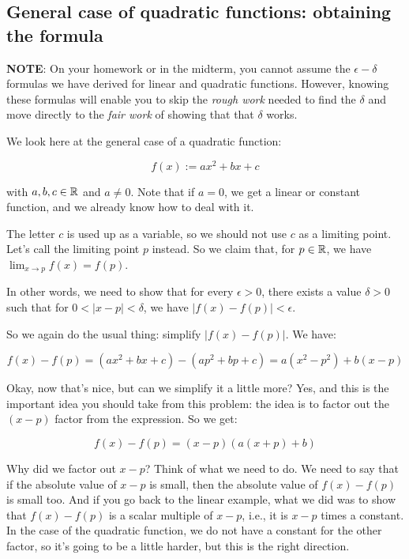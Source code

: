 \documentclass[10pt]{amsart}
\begin{document}
\subsection{General case of quadratic functions: obtaining the formula}

{\bf NOTE}: On your homework or in the midterm, you cannot assume the
$\epsilon-\delta$ formulas we have derived for linear and quadratic
functions. However, knowing these formulas will enable you to skip the
{\em rough work} needed to find the $\delta$ and move directly to the
{\em fair work} of showing that that $\delta$ works.

We look here at the general case of a quadratic function:

\begin{equation*}
  f(x) := ax^2 + bx + c
\end{equation*}

with $a,b,c \in \mathbb{R}$ and $a \ne 0$. Note that if $a = 0$, we get a
linear or constant function, and we already know how to deal with it.

The letter $c$ is used up as a variable, so we should not use $c$ as a
limiting point. Let's call the limiting point $p$ instead. So we claim
that, for $p \in \mathbb{R}$, we have $\lim_{x \to p} f(x) = f(p)$.

In other words, we need to show that for every $\epsilon > 0$, there
exists a value $\delta > 0$ such that for $0 < |x - p| < \delta$, we
have $|f(x) - f(p)| < \epsilon$.

So we again do the usual thing: simplify $|f(x) - f(p)|$. We have:

$$f(x) - f(p) = (ax^2 + bx + c) - (ap^2 + bp + c) = a(x^2 - p^2) + b(x - p)$$

Okay, now that's nice, but can we simplify it a little more? Yes, and
this is the important idea you should take from this problem: the idea
is to factor out the $(x - p)$ factor from the expression. So we get:

$$f(x) - f(p) = (x - p)(a(x + p) + b)$$

Why did we factor out $x - p$? Think of what we need to do. We need to
say that if the absolute value of $x - p$ is small, then the absolute
value of $f(x) - f(p)$ is small too. And if you go back to the linear
example, what we did was to show that $f(x) - f(p)$ is a scalar
multiple of $x - p$, i.e., it is $x - p$ times a constant. In the case
of the quadratic function, we do not have a constant for the other
factor, so it's going to be a little harder, but this is the right
direction.
\end{document}
